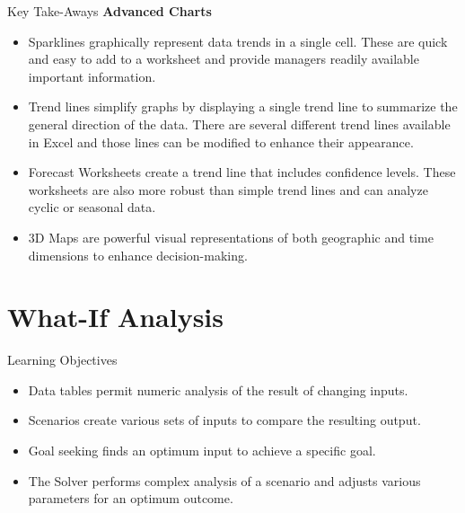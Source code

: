 \begin{center}
	\begin{tkwbox}{Key Take-Aways}
		\textbf{Advanced Charts}
		\\
		\begin{itemize}
			\setlength{\itemsep}{0pt}
			\setlength{\parskip}{0pt}
			\setlength{\parsep}{0pt}
			
			\item Sparklines graphically represent data trends in a single cell. These are quick and easy to add to a worksheet and provide managers readily available important information.
			\item Trend lines simplify graphs by displaying a single trend line to summarize the general direction of the data. There are several different trend lines available in Excel and those lines can be modified to enhance their appearance.
			\item Forecast Worksheets create a trend line that includes confidence levels. These worksheets are also more robust than simple trend lines and can analyze cyclic or seasonal data.
			\item $ 3 $D Maps are powerful visual representations of both geographic and time dimensions to enhance decision-making.
			
		\end{itemize}
	\end{tkwbox}
\end{center}

\section{What-If Analysis}

\begin{center}
	\begin{objbox}{Learning Objectives}
		\begin{itemize}
			\setlength{\itemsep}{0pt}
			\setlength{\parskip}{0pt}
			\setlength{\parsep}{0pt}
			
			\item Data tables permit numeric analysis of the result of changing inputs.
			\item Scenarios create various sets of inputs to compare the resulting output.
			\item Goal seeking finds an optimum input to achieve a specific goal.
			\item The Solver performs complex analysis of a scenario and adjusts various parameters for an optimum outcome.
			
		\end{itemize}
	\end{objbox}
\end{center}

